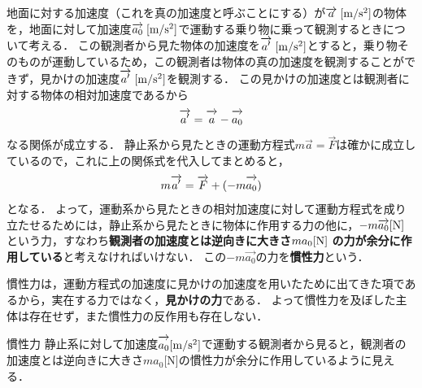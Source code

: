 地面に対する加速度（これを真の加速度と呼ぶことにする）が$\overrightarrow{a} \hspace{1mm} {\rm [m/s^2]}$の物体を，地面に対して加速度$\overrightarrow{a_0} \hspace{1mm} {\rm [m/s^2]}$で運動する乗り物に乗って観測するときについて考える．
この観測者から見た物体の加速度を$\overrightarrow{a'} \hspace{1mm} {\rm [m/s^2]}$とすると，乗り物そのものが運動しているため，この観測者は物体の真の加速度を観測することができず，見かけの加速度$\overrightarrow{a'} \hspace{1mm} {\rm [m/s^2]}$を観測する．
この見かけの加速度とは観測者に対する物体の相対加速度であるから
\[ \overrightarrow{a'\mathstrut} = \overrightarrow{a\mathstrut}-\overrightarrow{a_0\mathstrut}\]
なる関係が成立する．
静止系から見たときの運動方程式$m\overrightarrow{a}=\overrightarrow{F}$は確かに成立しているので，これに上の関係式を代入してまとめると，
\[m\overrightarrow{a'\mathstrut}=\overrightarrow{F\mathstrut}+(-m\overrightarrow{a_0\mathstrut})\]
となる．
よって，運動系から見たときの相対加速度に対して運動方程式を成り立たせるためには，静止系から見たときに物体に作用する力の他に，\mbox{\boldmath $-m\overrightarrow{a_0} {\rm [N]}$}という力，すなわち{\bf 観測者の加速度とは逆向きに大きさ}\mbox{\boldmath $ma_0{\rm [N]}$} {\bf の力が余分に作用している}と考えなければいけない．
この$-m\overrightarrow{a_0}$の力を{\bf 慣性力}という．

慣性力は，運動方程式の加速度に見かけの加速度を用いたために出てきた項であるから，実在する力ではなく，{\bf 見かけの力}である．
よって慣性力を及ぼした主体は存在せず，また慣性力の反作用も存在しない．


\begin{matome}{慣性力}
 \hspace{2mm} 静止系に対して加速度$\overrightarrow{a_0\mathstrut} {\rm [m/s^2]}$で運動する観測者から見ると，観測者の加速度とは逆向きに大きさ$ma_0$[N]の慣性力が余分に作用しているように見える．
 \end{matome}
 
  \ 
 
